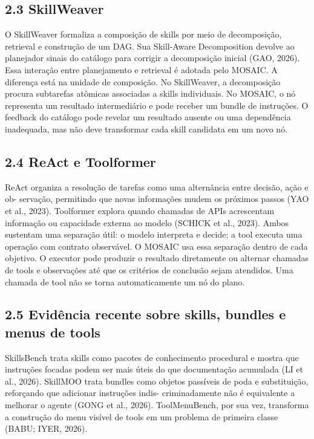 \documentclass[12pt,a4paper]{article}
\begin{document}
\subsection*{2.3 SkillWeaver}

O SkillWeaver formaliza a composição de skills por meio de decomposição, retrieval e construção de um DAG. Sua Skill-Aware Decomposition devolve ao planejador sinais do catálogo para corrigir a decomposição inicial (GAO, 2026). Essa interação entre planejamento e retrieval é adotada pelo MOSAIC. A diferença está na unidade de composição. No SkillWeaver, a decomposição procura subtarefas atômicas associadas a skills individuais. No MOSAIC, o nó representa um resultado intermediário e pode receber um bundle de instruções. O feedback do catálogo pode revelar um resultado ausente ou uma dependência inadequada, mas não deve transformar cada skill candidata em um novo nó.



\subsection*{2.4 ReAct e Toolformer}

ReAct organiza a resolução de tarefas como uma alternância entre decisão, ação e ob- servação, permitindo que novas informações mudem os próximos passos (YAO et al., 2023). Toolformer explora quando chamadas de APIs acrescentam informação ou capacidade externa ao modelo (SCHICK et al., 2023). Ambos sustentam uma separação útil: o modelo interpreta e decide; a tool executa uma operação com contrato observável. O MOSAIC usa essa separação dentro de cada objetivo. O executor pode produzir o resultado diretamente ou alternar chamadas de tools e observações até que os critérios de conclusão sejam atendidos. Uma chamada de tool não se torna automaticamente um nó do plano.


\subsection*{2.5 Evidência recente sobre skills, bundles e menus de tools}

SkillsBench trata skills como pacotes de conhecimento procedural e mostra que instruções focadas podem ser mais úteis do que documentação acumulada (LI et al., 2026). SkillMOO trata bundles como objetos passíveis de poda e substituição, reforçando que adicionar instruções indis- criminadamente não é equivalente a melhorar o agente (GONG et al., 2026). ToolMenuBench, por sua vez, transforma a construção do menu visível de tools em um problema de primeira classe (BABU; IYER, 2026).
\end{document}
